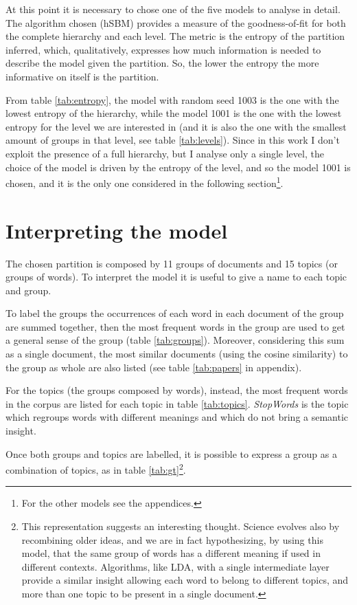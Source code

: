 \documentclass[a4paper, 11pt, headings=standardclasses, tablecaptionsbelow]{scrartcl}
\begin{document}


At this point it is necessary to chose one of the five models to analyse in detail. The algorithm chosen (hSBM) provides a measure of the goodness-of-fit for both the complete hierarchy and each level. The metric is the entropy of the partition inferred, which, qualitatively, expresses how much information is needed to describe the model given the partition. So, the lower the entropy the more informative on itself is the partition.

From table \ref{tab:entropy}, the model with random seed 1003 is the one with the lowest entropy of the hierarchy, while the model 1001 is the one with the lowest entropy for the level we are interested in (and it is also the one with the smallest amount of groups in that level, see table \ref{tab:levels}). Since in this work I don't exploit the presence of a full hierarchy, but I analyse only a single level, the choice of the model is driven by the entropy of the level, and so the model 1001 is chosen, and it is the only one considered in the following section\footnote{For the other models see the appendices.}.

\section{Interpreting the model}
The chosen partition is composed by 11 groups of documents and 15 topics (or groups of words).
To interpret the model it is useful to give a name to each topic and group.



To label the groups the occurrences of each word in each document of the group are summed together, then the most frequent words in the group are used to get a general sense of the group (table \ref{tab:groups}). Moreover, considering this sum as a single document, the most similar documents (using the cosine similarity) to the group as whole are also listed (see table \ref{tab:papers} in appendix).



For the topics (the groups composed by words), instead, the most frequent words in the corpus are listed for each topic in table \ref{tab:topics}. \textit{StopWords} is the topic which regroups words with different meanings and which do not bring a semantic insight.



Once both groups and topics are labelled, it is possible to express a group as a combination of topics, as in table \ref{tab:gt}\footnote{This representation suggests an interesting thought. Science evolves also by recombining older ideas, and we are in fact hypothesizing, by using this model, that the same group of words has a different meaning if used in different contexts. Algorithms, like LDA, with a single intermediate layer provide a similar insight allowing each word to belong to different topics, and more than one topic to be present in a single document.}.
\end{document}

